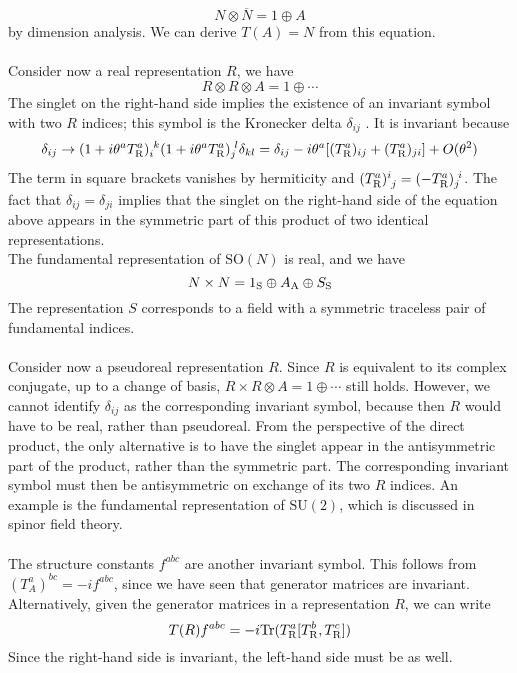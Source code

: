 \[N \otimes \overline{N} = 1 \oplus A \]
by dimension analysis. We can derive $T(A) = N$ from this equation.
\\ \\
Consider now a real representation $R$, we have
\[R \otimes R \otimes A = 1 \oplus \cdots\]
The singlet on the right-hand side implies the existence of an invariant symbol with two $R$ indices; this symbol is the Kronecker delta $\delta_{ij}$ . It is invariant because
\[\delta_{ij} \to (1+i\theta^a T^a_{\rm R})_{i}^{\phantom{i}k} (1+i\theta^a T^a_{\rm R})_{j}^{\phantom{i}l}\delta_{kl} = \delta_{ij} - i\theta^a [(T^a_{\rm R})_{ij} + (T^a_{\rm R})_{ji}] + O(\theta^2)\]
The term in square brackets vanishes by hermiticity and $(T^{a}_{\rm R})^{i}_{\phantom{i}j} = (-T^{a}_{\rm R})_{j}^{\phantom{i}i}$. 
The fact that $\delta_{ij} = \delta_{ji}$ implies that the singlet on the right-hand side of the equation above appears in the symmetric part of this product of two identical representations.
\\
The fundamental representation of $\mathrm{SO}(N)$ is real, and we have
\[N \times N = 1_{\rm S} \oplus A_{\rm A} \oplus S_{\rm S}\]
The representation $S$ corresponds to a field with a symmetric traceless pair of fundamental indices.
\\ \\
Consider now a pseudoreal representation $R$. Since $R$ is equivalent to its complex conjugate, up to a change of basis, $R \times R \otimes A = 1 \oplus \cdots$  still holds. However, we cannot identify $\delta_{ij}$ as the corresponding invariant symbol, because then $R$ would have to be real, rather than pseudoreal. 
From the perspective of the direct product, the only alternative is to have the singlet appear in the antisymmetric part of the product, rather than the symmetric part. The corresponding invariant symbol must then be antisymmetric on exchange of its two $R$ indices.
An example is the fundamental representation of $\mathrm{SU}(2)$, which is discussed in spinor field theory.
\\ \\
The structure constants $f^{abc}$ are another invariant symbol. This follows from $(T^a_A)^{bc} = -if^{abc}$, since we have seen that generator matrices are invariant.
\\
Alternatively, given the generator matrices in a representation $R$, we can write
\[T(R)f^{abc} = -i \mathrm{Tr}(T^a_{\rm R}[T^b_{\rm R},T^c_{\rm R}])\]
Since the right-hand side is invariant, the left-hand side must be as well.
\\
